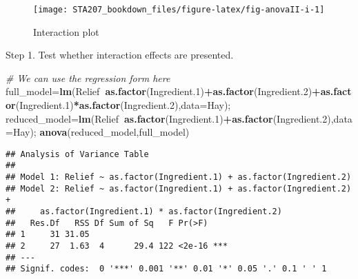 \documentclass[12pt,]{book}
\newenvironment{Shaded}{\begin{snugshade}}{\end{snugshade}}
\newcommand{\KeywordTok}[1]{\textcolor[rgb]{0.13,0.29,0.53}{\textbf{#1}}}
\newcommand{\DataTypeTok}[1]{\textcolor[rgb]{0.13,0.29,0.53}{#1}}
\newcommand{\DecValTok}[1]{\textcolor[rgb]{0.00,0.00,0.81}{#1}}
\newcommand{\CommentTok}[1]{\textcolor[rgb]{0.56,0.35,0.01}{\textit{#1}}}
\newcommand{\OperatorTok}[1]{\textcolor[rgb]{0.81,0.36,0.00}{\textbf{#1}}}
\newcommand{\NormalTok}[1]{#1}
\begin{document}
\begin{Shaded}
\end{Shaded}

\begin{figure}

{\centering \texttt{[image: STA207\_bookdown\_files/figure-latex/fig-anovaII-i-1]} 

}

\caption{Interaction plot}\label{fig:fig-anovaII-i}
\end{figure}

Step 1. Test whether interaction effects are presented.

\begin{Shaded}
\begin{Highlighting}[]
\CommentTok{# We can use the regression form here}
\NormalTok{full_model=}\KeywordTok{lm}\NormalTok{(Relief}\OperatorTok{~}\KeywordTok{as.factor}\NormalTok{(Ingredient.}\DecValTok{1}\NormalTok{)}\OperatorTok{+}\KeywordTok{as.factor}\NormalTok{(Ingredient.}\DecValTok{2}\NormalTok{)}\OperatorTok{+}\KeywordTok{as.factor}\NormalTok{(Ingredient.}\DecValTok{1}\NormalTok{)}\OperatorTok{*}\KeywordTok{as.factor}\NormalTok{(Ingredient.}\DecValTok{2}\NormalTok{),}\DataTypeTok{data=}\NormalTok{Hay);}
\NormalTok{reduced_model=}\KeywordTok{lm}\NormalTok{(Relief}\OperatorTok{~}\KeywordTok{as.factor}\NormalTok{(Ingredient.}\DecValTok{1}\NormalTok{)}\OperatorTok{+}\KeywordTok{as.factor}\NormalTok{(Ingredient.}\DecValTok{2}\NormalTok{),}\DataTypeTok{data=}\NormalTok{Hay);}
\KeywordTok{anova}\NormalTok{(reduced_model,full_model)}
\end{Highlighting}
\end{Shaded}

\begin{verbatim}
## Analysis of Variance Table
## 
## Model 1: Relief ~ as.factor(Ingredient.1) + as.factor(Ingredient.2)
## Model 2: Relief ~ as.factor(Ingredient.1) + as.factor(Ingredient.2) + 
##     as.factor(Ingredient.1) * as.factor(Ingredient.2)
##   Res.Df   RSS Df Sum of Sq   F Pr(>F)    
## 1     31 31.05                            
## 2     27  1.63  4      29.4 122 <2e-16 ***
## ---
## Signif. codes:  0 '***' 0.001 '**' 0.01 '*' 0.05 '.' 0.1 ' ' 1
\end{verbatim}
\end{document}
